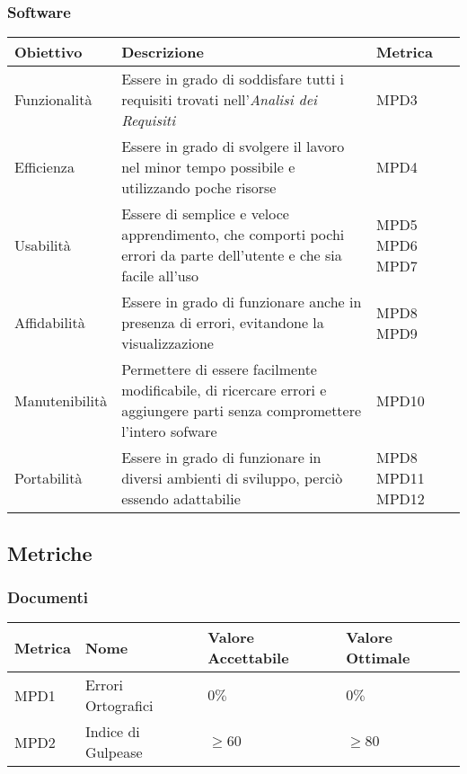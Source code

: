 \subsubsection{Software}
\begin{center}
  \begin{tabular}{|p{2.5cm}|p{8cm}|p{1.5cm}|} \hline
    \textbf{Obiettivo} & \textbf{Descrizione} & \textbf{Metrica}  \\ \hline
    Funzionalità & Essere in grado di soddisfare tutti i requisiti trovati nell'\textit{Analisi dei Requisiti}  & MPD3       \\ \hline
    Efficienza & Essere in grado di svolgere il lavoro nel minor tempo possibile e utilizzando poche risorse   & MPD4       \\ \hline
    Usabilità & Essere di semplice e veloce apprendimento, che comporti pochi errori da parte dell'utente e che sia facile all'uso  & MPD5 \newline MPD6 \newline MPD7    \\ \hline
    Affidabilità & Essere in grado di funzionare anche in presenza di errori, evitandone la visualizzazione  & MPD8 \newline MPD9       \\ \hline
    Manutenibilità & Permettere di essere facilmente modificabile, di ricercare errori e aggiungere parti senza compromettere l'intero sofware  & MPD10       \\ \hline
    Portabilità & Essere in grado di funzionare in diversi ambienti di sviluppo, perciò essendo adattabilie & MPD8 \newline MPD11 \newline MPD12       \\ \hline
  \end{tabular}
\end{center}


\subsection{Metriche}
\subsubsection{Documenti}
\begin{center}
  \begin{tabular}{|p{2cm}|p{4cm}|p{4cm}|p{3.5cm}|} \hline
    \textbf{Metrica} & \textbf{Nome} & \textbf{Valore Accettabile} & \textbf{Valore Ottimale}    \\ \hline
      MPD1 & Errori Ortografici    & $0\%$      & $0\%$        \\ \hline
      MPD2 & Indice di Gulpease    & $\geq60$   & $\geq80$     \\ \hline
  \end{tabular}
\end{center}
